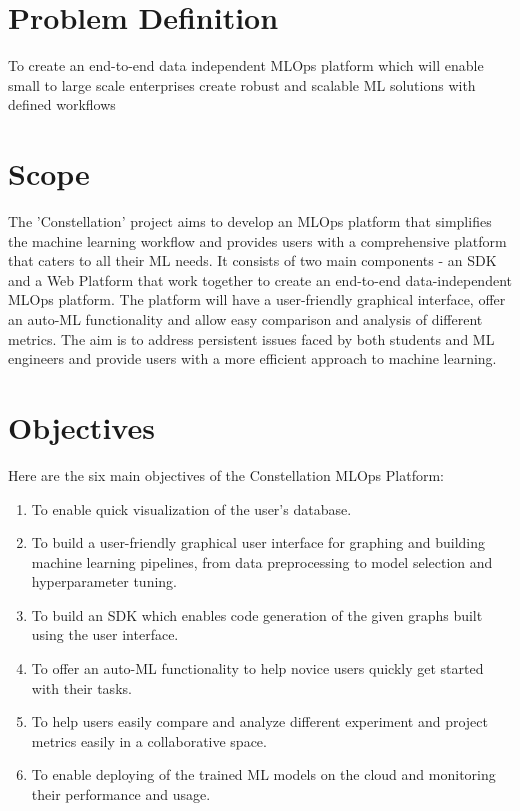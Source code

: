 \documentclass[12pt,a4paper]{report}     %
\begin{document}
\begin{normalsize}
{\section{Problem Definition}
To create an end-to-end data independent MLOps platform which will enable small to large scale enterprises create robust and scalable ML solutions with defined workflows
\section{Scope}
The 'Constellation' project aims to develop an MLOps platform that simplifies the machine learning workflow and provides users with a comprehensive platform that caters to all their ML needs. It consists of two main components - an SDK and a Web Platform that work together to create an end-to-end data-independent MLOps platform. The platform will have a user-friendly graphical interface, offer an auto-ML functionality and allow easy comparison and analysis of different metrics. The aim is to address persistent issues faced by both students and ML engineers and provide users with a more efficient approach to machine learning.
\section{Objectives}
Here are the six main objectives of the Constellation MLOps Platform:
\begin{enumerate}
\item To enable quick visualization of the user's database.
\item To build a user-friendly graphical user interface for graphing and building machine learning pipelines, from data preprocessing to model selection and hyperparameter tuning.
\item To build an SDK which enables code generation of the given graphs built using the user interface.
\item To offer an auto-ML functionality to help novice users quickly get started with their tasks.
\item To help users easily compare and analyze different experiment and project metrics easily in a collaborative space.
\item To enable deploying of the trained ML models on the cloud and monitoring their performance and usage.
\end{enumerate}
}
\end{normalsize}
\end{document}
